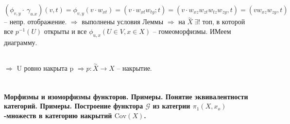 	$(\phi_{v,y} \cdot\ \gamma_{u.x})(v,t) = \phi_{v,y}(v\cdot w_{xt}) = (v\cdot w_{xt} w_{ty}; t) = (v\cdot w_{xz} w_{zt} w_{tz} w_{zy}, t) = (v w_{xz} w_{zy}, t)$ -- непр. отображение. $\Rightarrow$ выполнены условия Леммы $\Rightarrow$ на $\overset{\sim}{X}\ \exists$! топ, в которой все $p^{-1}(U)$ открыты и все $\phi_{u,x}(U\in V, x\in X)$ -- гомеоморфизмы. ИМеем диаграмму.\\
	\begin{figure}[h]
	\end{figure}\\
	$\Rightarrow$ U ровно накрыта p $\Rightarrow p: \overset{\sim}{X} \rightarrow X$ -- накрытие.
	


\newpage
\section{}
	\textbf{Морфизмы и изоморфизмы функторов. Примеры. Понятие эквивалентности категорий. Примеры. Построение функтора $\mathscr{G}$ из категрии ${\pi}_1 (X,x_o)$-множеств в категорию накрытий $\text{Cov}(X)$.}\\
	\\


\newpage
